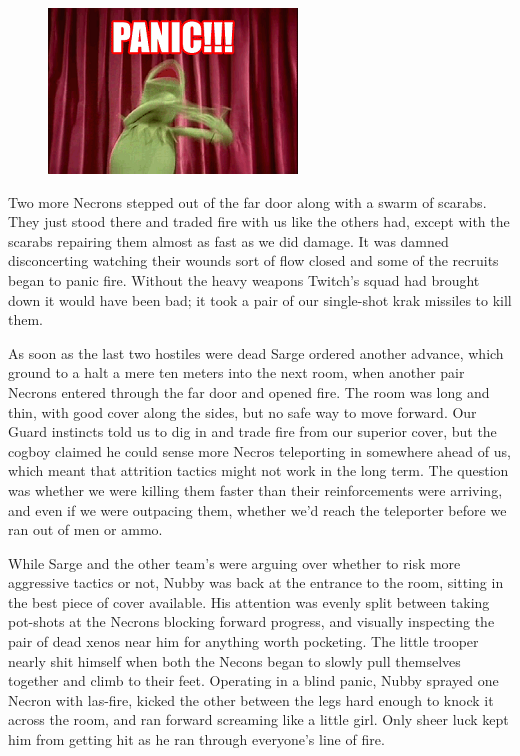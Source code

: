 \begin{figure}
	\begin{center}
		\includegraphics[width=\figwidth]{pics/8/47.png}
	\end{center}
\end{figure}
Two more Necrons stepped out of the far door along with a swarm of scarabs. 
They just stood there and traded fire with us like the others had, except with the scarabs repairing them almost as fast as we did damage. 
It was damned disconcerting watching their wounds sort of flow closed and some of the recruits began to panic fire. 
Without the heavy weapons Twitch’s squad had brought down it would have been bad; 
it took a pair of our single-shot krak missiles to kill them.

As soon as the last two hostiles were dead Sarge ordered another advance, which ground to a halt a mere ten meters into the next room, when another pair Necrons entered through the far door and opened fire. 
The room was long and thin, with good cover along the sides, but no safe way to move forward. 
Our Guard instincts told us to dig in and trade fire from our superior cover, but the cogboy claimed he could sense more Necros teleporting in somewhere ahead of us, which meant that attrition tactics might not work in the long term. 
The question was whether we were killing them faster than their reinforcements were arriving, and even if we were outpacing them, whether we’d reach the teleporter before we ran out of men or ammo.

While Sarge and the other team’s were arguing over whether to risk more aggressive tactics or not, Nubby was back at the entrance to the room, sitting in the best piece of cover available. 
His attention was evenly split between taking pot-shots at the Necrons blocking forward progress, and visually inspecting the pair of dead xenos near him for anything worth pocketing. 
The little trooper nearly shit himself when both the Necons began to slowly pull themselves together and climb to their feet. 
Operating in a blind panic, Nubby sprayed one Necron with las-fire, kicked the other between the legs hard enough to knock it across the room, and ran forward screaming like a little girl. 
Only sheer luck kept him from getting hit as he ran through everyone’s line of fire.

